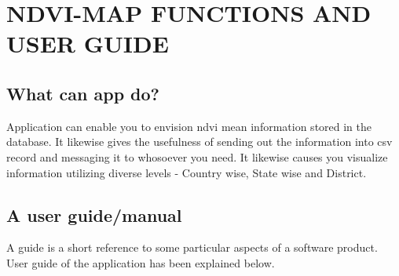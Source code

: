 \chapter{NDVI-MAP FUNCTIONS AND USER GUIDE}
\label{chap:ndvi & it's user guide}

\section{What can app do?}

Application can enable you to envision \gls{ndvi} mean information stored in the database. It likewise gives the usefulness of sending out the information into \gls{csv} record and messaging it to whosoever you need. It likewise causes you visualize information utilizing diverse levels - Country wise, State wise and District.

\section{A user guide/manual}

A guide is a short reference to some particular aspects of a software product. User guide of the application has been explained below.

